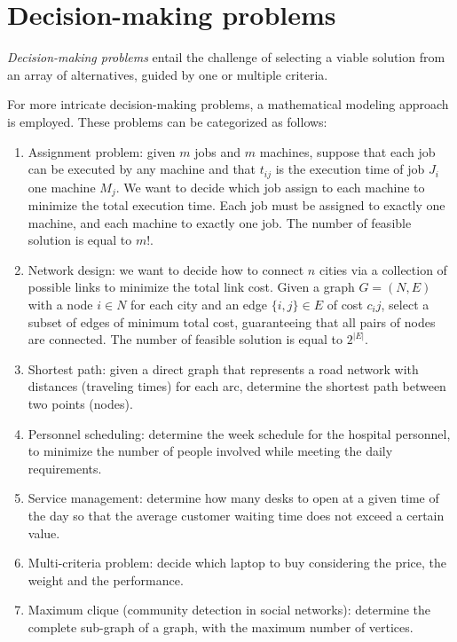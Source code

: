 \documentclass[12pt, a4paper]{report}
\begin{document}
    \section{Decision-making problems}
    \begin{definition}
        \emph{Decision-making problems} entail the challenge of selecting a viable solution from an array of alternatives, guided by one or multiple criteria.
    \end{definition}
    For more intricate decision-making problems, a mathematical modeling approach is employed. 
    These problems can be categorized as follows:
    \begin{enumerate}
        \item Assignment problem: given $m$ jobs and $m$ machines, suppose that each job can be executed by any machine and that $t_{ij}$ is the execution time of job $J_i$ one
            machine $M_j$. We want to decide which job assign to each machine to minimize the total execution time. Each job must be assigned to exactly one machine, and each 
            machine to exactly one job. The number of feasible solution is equal to $m!$. 
        \item Network design: we want to decide how to connect $n$ cities via a collection of possible links to minimize the total link cost. 
            Given a graph $G=(N,E)$ with a node $i \in N$ for each city and an edge $\{i,j\} \in E$ of cost $c_ij$, select a subset of edges of minimum total cost, guaranteeing that 
            all pairs of nodes are connected. The number of feasible solution is equal to $2^{\left\lvert E \right\rvert}$. 
        \item Shortest path: given a direct graph that represents a road network with distances (traveling times) for each arc, determine the shortest path between two points (nodes).
        \item Personnel scheduling: determine the week schedule for the hospital personnel, to minimize the number of people involved while meeting the daily requirements.
        \item Service management: determine how many desks to open at a given time of the day so that the average customer waiting time does not exceed a certain value. 
        \item Multi-criteria problem: decide which laptop to buy considering the price, the weight and the performance. 
        \item Maximum clique (community detection in social networks): determine the complete sub-graph of a graph, with the maximum number of vertices.
    \end{enumerate}
\end{document}
